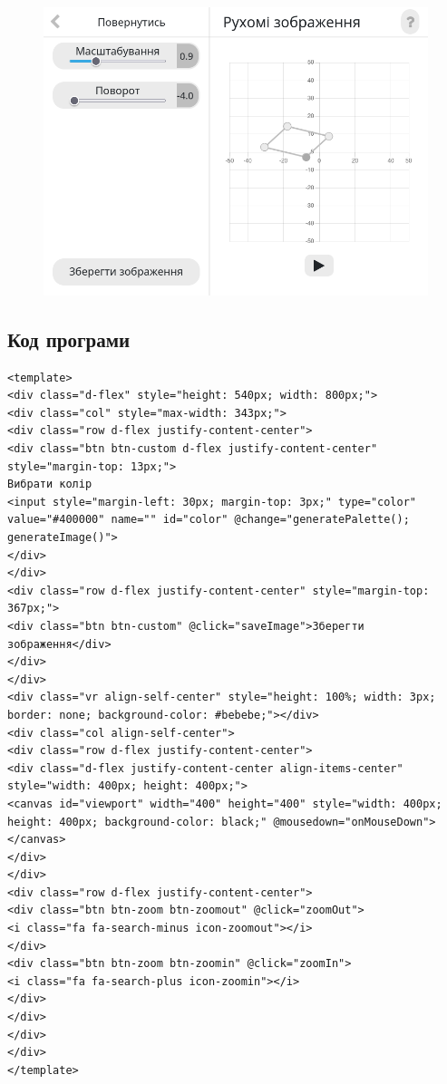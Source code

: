\documentclass[oneside,14pt]{extarticle}
\begin{document}
\begin{normalsize}
	\begin{figure}[H]
		\centering
		\includegraphics[scale=0.6]{42}
		\caption{}
	\end{figure}
	
	\subsection{Код програми}
	\begin{tiny}
		\begin{lstlisting}
<template>
<div class="d-flex" style="height: 540px; width: 800px;">
<div class="col" style="max-width: 343px;">
<div class="row d-flex justify-content-center">
<div class="btn btn-custom d-flex justify-content-center" style="margin-top: 13px;">
Вибрати колір
<input style="margin-left: 30px; margin-top: 3px;" type="color" value="#400000" name="" id="color" @change="generatePalette(); generateImage()">
</div>
</div>
<div class="row d-flex justify-content-center" style="margin-top: 367px;">
<div class="btn btn-custom" @click="saveImage">Зберегти зображення</div>
</div>
</div>
<div class="vr align-self-center" style="height: 100%; width: 3px; border: none; background-color: #bebebe;"></div>
<div class="col align-self-center">
<div class="row d-flex justify-content-center">
<div class="d-flex justify-content-center align-items-center" style="width: 400px; height: 400px;">
<canvas id="viewport" width="400" height="400" style="width: 400px; height: 400px; background-color: black;" @mousedown="onMouseDown"></canvas>
</div>
</div>
<div class="row d-flex justify-content-center">
<div class="btn btn-zoom btn-zoomout" @click="zoomOut">
<i class="fa fa-search-minus icon-zoomout"></i>
</div>
<div class="btn btn-zoom btn-zoomin" @click="zoomIn">
<i class="fa fa-search-plus icon-zoomin"></i>
</div>
</div>
</div>
</div>
</template>


\end{lstlisting}
\end{tiny}
\end{normalsize}
\end{document}
